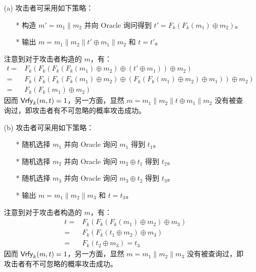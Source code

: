 \begin{questions}
        \begin{solution}
            \begin{enumerate}
                \item[(a)] 攻击者可采用如下策略：
                \begin{enumerate}
                    \item[*] 构造 $m'=m_1\parallel{m_2}$ 并向 Oracle 询问得到 $t'=F_k(F_k(m_1)\oplus{m_2})$。
                    \item[*] 输出 $m=m_1\parallel{m_2}\parallel{t'\oplus{m_1}}\parallel{m_2}$ 和 $t=t'$。
                \end{enumerate}
                注意到对于攻击者构造的 $m$，有：
                \begin{equation}
                    \begin{aligned}
                        t=&F_k(F_k(F_k(F_k(m_1)\oplus{m_2})\oplus{(t'\oplus{m_1})})\oplus{m_2})\\
                        =&F_k(F_k(F_k(F_k(m_1)\oplus{m_2})\oplus{(F_k(F_k(m_1)\oplus{m_2})\oplus{m_1})})\oplus{m_2})\\
                        =&F_k(F_k(m_1)\oplus{m_2})
                    \end{aligned}
                \end{equation}
                因而 $\mathsf{Vrfy}_k(m,t)=1$，另一方面，显然 $m=m_1\parallel{m_2}\parallel{t\oplus{m_1}}\parallel{m_2}$ 没有被查询过，即攻击者有不可忽略的概率攻击成功。
                \item[(b)] 攻击者可采用如下策略：
                \begin{enumerate}
                    \item[*] 随机选择 $m_1$ 并向 Oracle 询问 $m_1$ 得到 $t_1$。
                    \item[*] 随机选择 $m_2$ 并向 Oracle 询问 $m_2\oplus{t_1}$ 得到 $t_2$。
                    \item[*] 随机选择 $m_3$ 并向 Oracle 询问 $m_3\oplus{t_2}$ 得到 $t_3$。
                    \item[*] 输出 $m=m_1\parallel{m_2}\parallel{m_3}$ 和 $t=t_3$。
                \end{enumerate}
                注意到对于攻击者构造的 $m$，有：
                \begin{equation}
                    \begin{aligned}
                        t=&F_k(F_k(F_k(m_1)\oplus{m_2})\oplus{m_3})\\
                        =&F_k(F_k(t_1\oplus{m_2})\oplus{m_3})\\
                        =&F_k(t_2\oplus{m_3})=t_3
                    \end{aligned}
                \end{equation}
                因而 $\mathsf{Vrfy}_k(m,t)=1$，另一方面，显然 $m=m_1\parallel{m_2}\parallel{m_3}$ 没有被查询过，即攻击者有不可忽略的概率攻击成功。
            \end{enumerate}
        \end{solution}


\end{questions}
